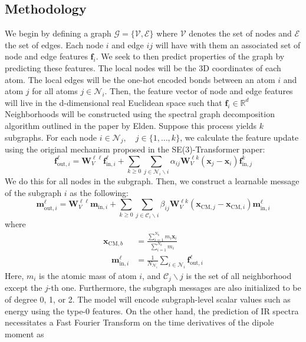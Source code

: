 \documentclass{article}
\begin{document}
\subsection{Methodology}
We begin by defining a graph $\mathcal{G} = \{\mathcal{V}, \mathcal{E}\}$ where $\mathcal{V}$ denotes the set of nodes and $\mathcal{E}$ the set of edges. Each node $i$ and edge $ij$ will have with them an associated set of node and edge features $\mathbf{f}_i$. We seek to then predict properties of the graph by predicting these features. The local nodes will be the 3D coordinates of each atom. The local edges will be the one-hot encoded bonds between an atom $i$ and atom $j$ for all atoms $j \in \mathcal{N}_i$. Then, the feature vector of node and edge features will live in the d-dimensional real Euclidean space  such that $\mathbf{f}_i \in \mathbb{R}^d$ Neighborhoods will be constructed using the spectral graph decomposition algorithm outlined in the paper by Elden. Suppose this process yields $k$ subgraphs. For each node $i \in \mathcal{N}_j, \quad j \in \{1, \dots, k\}$, we calculate the feature update using the original mechanism proposed in the SE(3)-Transformer paper:
\begin{equation}
\mathbf{f}_{\text{out},i}^\ell = \mathbf{W}_V^{\ell \ell}\mathbf{f}_{\text{in},i}^\ell + \sum_{k \geq 0} \sum_{j \in \mathcal{N}_i \backslash i} \alpha_{ij} \mathbf{W}_V^{\ell k}(\mathbf{x}_j -\mathbf{x}_i)\mathbf{f}_{\text{in},j}^k
\end{equation}
\noindent
We do this for all nodes in the subgraph. Then, we construct a learnable message of the subgraph $i$ as the following:
\begin{equation}
\mathbf{m}_{\text{out},i}^\ell =\mathbf{W}^{\ell \ell}_V \mathbf{m}_{\text{in}, i} + \sum_{k \geq 0} \sum_{j \in \mathcal{C}_i \backslash i} \beta_{ij}\mathbf{W}^{\ell k}_V(\mathbf{x}_{\text{CM}, j } - \mathbf{x}_{\text{CM}, i})\mathbf{m}_{\text{in},i}^\ell
\end{equation}
\noindent 
where 
\begin{align}
\mathbf{x}_{\text{CM}, b} &= \frac{\sum_{i=1}^{N_b} m_i\mathbf{x}_i}{\sum_{i=1}^{N_b} m_i} \\
\quad \mathbf{m}_{\text{in}, i}^{\ell} &= \frac{1}{N_{\mathcal{N}_i}} \sum_{i \in \mathcal{N}_i}\mathbf{f}_{\text{out},i}^{\ell}
\end{align}
Here, $m_i$ is the atomic mass of atom $i$, and $\mathcal{C}_j \backslash j$ is the set of all neighborhood except the $j$-th one. Furthermore, the subgraph messages are also initialized to be of degree 0, 1, or 2. The model will encode subgraph-level scalar values such as energy using the type-0 features. On the other hand, the prediction of IR spectra necessitates a Fast Fourier Transform on the time derivatives of the dipole moment as
\end{document}
